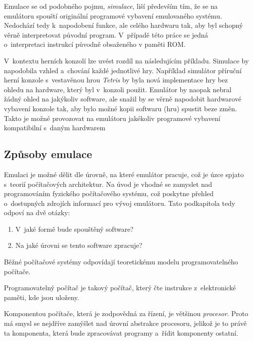 Emulace se od podobného pojmu, \emph{simulace}, liší především tím, že se na emulátoru spouští originální programové vybavení emulovaného systému. Nedochází tedy k~napodobení funkce, ale celého hardwaru tak, aby byl schopný věrně interpretovat původní program. V~případě této práce se jedná o~interpretaci instrukcí původně obsaženého v paměti ROM.

\begin{example}
V~kontextu herních konzolí lze uvést rozdíl na následujícím příkladu. Simulace by napodobila vzhled a~chování každé jednotlivé hry. Například simulátor příruční herní konzole s~vestavěnou hrou \emph{Tetris} by byla nová implementace hry bez ohledu na hardware, který byl v~konzoli použit. Emulátor by naopak nebral žádný ohled na jakýkoliv software, ale snažil by se věrně napodobit hardwarové vybavení konzole tak, aby bylo možné kopii softwaru (hru) spustit beze změn. Takto je možné provozovat na emulátoru jakékoliv programové vybavení kompatibilní s~daným hardwarem \cite{FulberGarcia2022:simulation-emulation}
\end{example}

\subsection{Způsoby emulace}
Emulaci je možné dělit dle úrovně, na které emulátor pracuje, což je úzce spjato s~teorií počítačových architektur. Na úvod je vhodné se zamyslet nad programováním fyzického počítačového systému, což poskytne přehled o~dostupných zdrojích informací pro vývoj emulátoru. Tato podkapitola tedy odpoví na dvě otázky:
\begin{enumerate}
	\item V~jaké formě bude spouštěný software?
	\item Na jaké úrovni se tento software zpracuje?
\end{enumerate}

Běžné počítačové systémy odpovídají teoretickému modelu programovatelného počítače.

\begin{definition}
	Programovatelný počítač je takový počítač, který čte instrukce z~elektronické paměti, kde jsou uloženy.~\cite{Wikipedia:programovatelny-pocitac}
\end{definition}

Komponentou počítače, která je zodpovědná za řízení, je většinou \emph{procesor}. Proto má smysl se nejdříve zamýšlet nad úrovní abstrakce procesoru, jelikož je to právě ta komponenta, která bude zpracovávat programy a~řídit komponenty ostatní.

